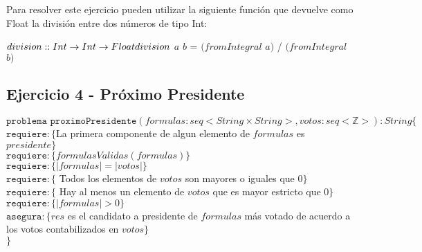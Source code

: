 	Para resolver este ejercicio pueden utilizar la siguiente función que devuelve como Float la división entre dos números de tipo Int:
	
	$division :: Int \rightarrow Int \rightarrow Float\\
	division$ $a$ $b$ = $(fromIntegral$ $a)$ / $(fromIntegral$ $b)$
	\newpage
	\subsection{Ejercicio 4 - Próximo Presidente}
	$\texttt{problema proximoPresidente}(formulas:seq<String \times String>,votos:seq<\mathbb{Z}>) : String \lbrace$\\
	$\texttt{requiere}:\lbrace $La primera componente de algun elemento de $formulas$ es $presidente \rbrace$\\
	$\texttt{requiere}:\lbrace formulasValidas(formulas) \rbrace$\\
	$\texttt{requiere}:\lbrace |formulas| = |votos| \rbrace$\\
	$\texttt{requiere}:\lbrace$ Todos los elementos de $votos$ son mayores o iguales que 0$\rbrace$\\
	$\texttt{requiere}:\lbrace$ Hay al menos un elemento de $votos$ que es mayor estricto que 0$\rbrace$\\
	$\texttt{requiere}:\lbrace |formulas|>0\rbrace$\\
	$\texttt{asegura}:\lbrace res$ es el candidato a presidente de $formulas$ más votado de acuerdo a los votos contabilizados en $votos \rbrace$\\
	$\rbrace$
	
	
